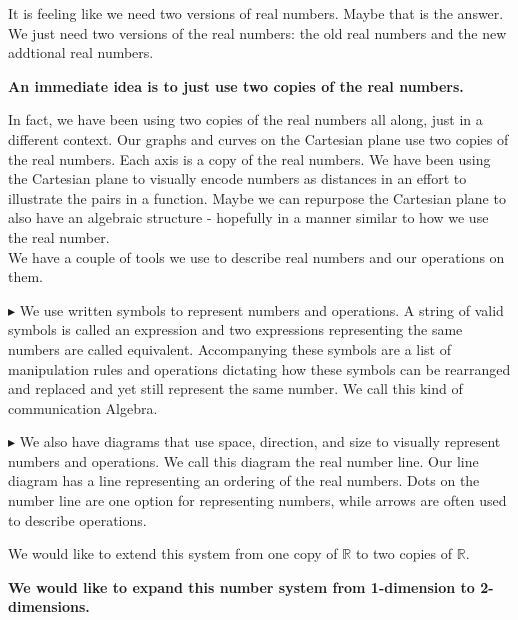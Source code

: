 \documentclass{ximera}
\begin{document}
It is feeling like we need two versions of real numbers. Maybe that is the answer. We just need two versions of the real numbers: the old real numbers and the new addtional real numbers.





\begin{center}
\textbf{\textcolor{purple!85!blue}{An immediate idea is to just use two copies of the real numbers.}}
\end{center}


In fact, we have been using two copies of the real numbers all along, just in a different context. Our graphs and curves on the Cartesian plane use two copies of the real numbers.  Each axis is a copy of the real numbers. We have been using the Cartesian plane to visually encode numbers as distances in an effort to illustrate the pairs in a function. Maybe we can repurpose the Cartesian plane to also have an algebraic structure - hopefully in a manner similar to how we use the real number. \\








We have a couple of tools we use to describe real numbers and our operations on them.


$\blacktriangleright$  We use written symbols to represent numbers and operations.  A string of valid symbols is called an expression and two expressions representing the same numbers are called equivalent. Accompanying these symbols are a list of manipulation rules and operations dictating how these symbols can be rearranged and replaced and yet still represent the same number.  We call this kind of communication Algebra.


$\blacktriangleright$  We also have diagrams that use space, direction, and size to visually represent numbers and operations. We call this diagram the real number line. Our line diagram has a line representing an ordering of the real numbers. Dots on the number line are one option for representing numbers, while arrows are often used to describe operations.


We would like to extend this system from one copy of \textbf{$\mathbb{R}$} to two copies of \textbf{$\mathbb{R}$}. \\



\begin{center}
\textbf{\textcolor{red!90!darkgray}{We would like to expand this number system from 1-dimension to 2-dimensions.}}
\end{center}
\end{document}
